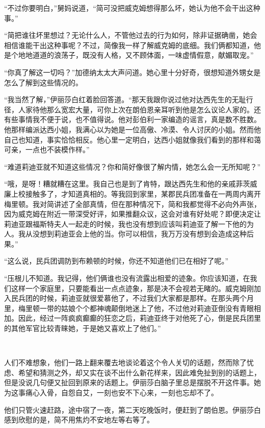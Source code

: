 \par “不过你要明白，”舅妈说道，“简可没把威克姆想得那么坏，她认为他不会干出这种事。”
\par “简把谁往坏里想过？无论什么人，不管他过去的行为如何，除非证据确凿，她会相信谁能干出这种事呢？不过，简像我一样了解威克姆的底细。我们俩都知道，他是个地地道道的浪荡子，既没有人格，又不顾体面，一味虚情假意，献媚取宠。”
\par “你真了解这一切吗？”加德纳太太大声问道。她心里十分好奇，很想知道外甥女是怎么了解到这些情况的。
\par “我当然了解，”伊丽莎白红着脸回答道。“那天我跟你说过他对达西先生的无耻行径，人家待他那么宽宏大量，可你上次在朗伯恩亲耳听到他是怎么议论人家的。还有些事情我不便于说，也不值得说。他对彭伯利一家编造的谣言，真是数不胜数。他那样编派达西小姐，我满心以为她是一位高傲、冷漠、令人讨厌的小姐。然而他自己也知道，事实恰恰相反。他心里一定明白，达西小姐就像我们看到的那样和蔼可亲，一点也不装模作样。”
\par “难道莉迪亚就不知道这些情况？你和简好像很了解内情，她怎么会一无所知呢？”
\par “哦，是呀！糟就糟在这里。我自己也是到了肯特，跟达西先生和他的亲戚菲茨威廉上校接触多了，才知道真相的。等我回到家里，某郡民兵团准备在一两周内离开梅里顿。我对简讲述了全部真情，但在那种情况下，简和我都觉得不必向外声张，因为威克姆在附近一带深受好评，如果推翻众议，这会对谁有好处呢？即便决定让莉迪亚跟福斯特夫人一起走的时候，我也没有想到应该叫莉迪亚了解一下他的为人。我从没想到莉迪亚会上他的当。你可以相信，我万万没有想到会造成这种后果。”
\par “这么说，民兵团调防到布赖顿的时候，你还不知道他们已在相好了呢。”
\par “压根儿不知道。我记得，他们俩谁也没有流露出相爱的迹象。你应该知道，在我们这样一个家庭里，只要能看出一点点迹象，那是决不会视若无睹的。威克姆刚加入民兵团的时候，莉迪亚就很爱慕他了，不过我们大家都是那样。在那头两个月里，梅里顿一带的姑娘个个都神魂颠倒地迷上了他，不过他对莉迪亚倒没有青眼相加。因此，经过一阵疯疯癫癫的狂恋之后，莉迪亚终于对他死了心，倒是民兵团里的其他军官比较青睐她，于是她又喜欢上了他们。”
\par  
\par 人们不难想象，他们一路上翻来覆去地谈论着这个令人关切的话题，然而除了忧虑、希望和猜测之外，却又实在谈不出什么新花样来，因此难免扯到别的话题上，但是没说几句便又扯回到原来的话题上。伊丽莎白脑子里总是摆脱不开这件事。她为这事痛心入骨，自怨自艾，一刻也安不下心来，一刻也忘却不了。
\par 他们只管火速赶路，途中宿了一夜，第二天吃晚饭时，便赶到了朗伯恩。伊丽莎白感到欣慰的是，简不用焦灼不安地左等右等了。
